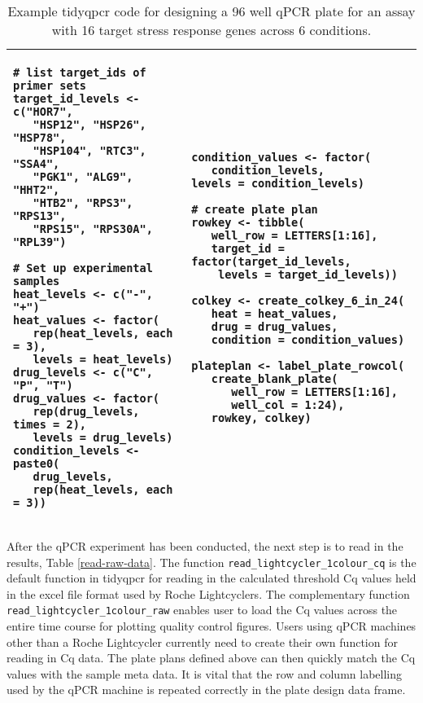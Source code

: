 \documentclass[../main.tex]{subfiles}
\begin{document}
\begin{table}
\centering
\begin{tabular}{ |p{5.6cm}  p{5.6cm}|}
\hline
  \begin{lstlisting}[style=mystyle]
# list target_ids of primer sets
target_id_levels <- c("HOR7",
   "HSP12", "HSP26", "HSP78",
   "HSP104", "RTC3", "SSA4",
   "PGK1", "ALG9", "HHT2",
   "HTB2", "RPS3", "RPS13",
   "RPS15", "RPS30A", "RPL39")

# Set up experimental samples
heat_levels <- c("-", "+")
heat_values <- factor(
   rep(heat_levels, each = 3),
   levels = heat_levels)
drug_levels <- c("C", "P", "T")
drug_values <- factor(
   rep(drug_levels, times = 2),
   levels = drug_levels)
condition_levels <- paste0(
   drug_levels,
   rep(heat_levels, each = 3))
\end{lstlisting}
 & 
 \begin{lstlisting}[firstnumber=20,style=mystyle]
condition_values <- factor(
   condition_levels,
levels = condition_levels)
 
# create plate plan
rowkey <- tibble(
   well_row = LETTERS[1:16],
   target_id = factor(target_id_levels, 
    levels = target_id_levels))

colkey <- create_colkey_6_in_24(
   heat = heat_values,
   drug = drug_values,
   condition = condition_values)

plateplan <- label_plate_rowcol(
   create_blank_plate(
      well_row = LETTERS[1:16],
      well_col = 1:24),
   rowkey, colkey)
\end{lstlisting} \\ 
\hline
\end{tabular}
\caption*{Example tidyqpcr code for designing a 96 well qPCR plate for an assay with 16 target stress response genes across 6 conditions.}
\label{create-plate-plan}
\end{table}
After the qPCR experiment has been conducted, the next step is to read in the results, Table \ref{read-raw-data}. 
The function \lstinline{read_lightcycler_1colour_cq} is the default function in tidyqpcr for reading in the calculated threshold Cq values held in the excel file format used by Roche Lightcyclers. 
The complementary function \lstinline{read_lightcycler_1colour_raw} enables user to load the Cq values across the entire time course for plotting quality control figures. 
Users using qPCR machines other than a Roche Lightcycler currently need to create their own function for reading in Cq data. 
The plate plans defined above can then quickly match the Cq values with the sample meta data. It is vital that the row and column labelling used by the qPCR machine is repeated correctly in the plate design data frame. 
\end{document}
